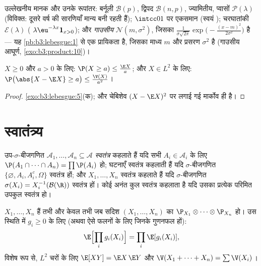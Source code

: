 \begin{example}\label{ex:b3:probability:laws}
उल्लेखनीय मानक  और उनके रूपांतर: बर्नूली $\mathcal B(p)$, द्विपद
$\mathcal B(n, p)$, ज्यामितीय, प्वासों $\mathcal P(\lambda)$ (विविक्त: दूसरे वर्ष की सारणियाँ मान्य
बनी रहती हैं); $\intcc01$ पर एकसमान (स्वयं ); चरघातांकी $\mathcal E(\lambda)$
( $\lambda\eu^{-\lambda x}\mathbf 1_{x>0}$); और \emph{गाउसीय} $\mathcal N(m, \sigma^2)$, जिसका
 $\frac1{\sigma\sqrt{2\pi}}\exp\bigl(-\frac{(x -
m)^2}{2\sigma^2}\bigr)$ है --- यह \cref{pb:b3:lebesgue:1} से एक प्रायिकता  है, जिसका माध्य
$m$ और प्रसरण $\sigma^2$ है (गाउसीय आघूर्ण, \cref{exo:b3:product:10})।
\end{example}

\begin{proposition}[मार्कोव और चेबिशेव]
\label{prop:b3:probability:markov}
$X \geq 0$ और $a > 0$ के लिए: $\P(X \geq a) \leq \frac{\E
X}{a}$; और $X \in L^2$ के लिए: $\P\bigl(\abs{X - \E X} \geq
a\bigr) \leq \frac{\V(X)}{a^2}$।
\end{proposition}

\begin{proof}
\cref{exo:b3:lebesgue:5}(क); और चेबिशेव $(X - \E X)^2$ पर लगाई गई मार्कोव ही है।
\end{proof}

\section{स्वातंत्र्य}

\begin{definition}\label{def:b3:probability:independence}
उप-$\sigma$-बीजगणित $\mathcal A_1, \dots, \mathcal A_n
\subseteq \mathcal A$ \emph{स्वतंत्र} कहलाते हैं
यदि सभी $A_i \in
\mathcal A_i$ के लिए $\P(A_1\cap\dots\cap A_n) = \prod\P(A_i)$ हो; घटनाएँ स्वतंत्र कहलाती हैं यदि
$\sigma$-बीजगणित $\{\varnothing, A_i, A_i^c, \Omega\}$ स्वतंत्र हों; और  $X_1, \dots, X_n$ स्वतंत्र
कहलाते हैं यदि $\sigma$-बीजगणित $\sigma(X_i) =
X_i^{-1}(\mathcal B(\R))$ स्वतंत्र हों। कोई अनंत कुल स्वतंत्र
कहलाता है यदि उसका प्रत्येक परिमित उपकुल स्वतंत्र हो।
\end{definition}

\begin{theorem}\label{thm:b3:probability:independence}
$X_1, \dots, X_n$  हैं तभी और केवल तभी जब सदिश $(X_1, \dots, X_n)$ का   $\P_{X_1}\otimes\cdots\otimes\P_{X_n}$ हो। उस स्थिति में $g_i \geq 0$ के लिए (अथवा ऐसे फलनों के लिए जिनके
गुणनफल  हों):
\[
\E\Bigl[\prod_ig_i(X_i)\Bigr] = \prod_i\E[g_i(X_i)],
\]
विशेष रूप से,  $L^2$ चरों के लिए $\E[XY] = \E X\,\E Y$ और $\V(X_1 + \dots +
X_n) = \sum\V(X_i)$।
\end{theorem}

